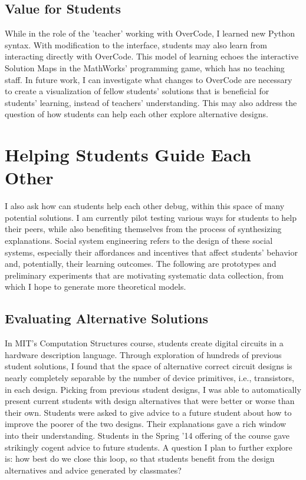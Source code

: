\documentclass{sigchi}
\begin{document}
\subsection{Value for Students}
While in the role of the 'teacher' working with OverCode, I learned new Python syntax. With modification to the interface, students may also learn from interacting directly with OverCode. This model of learning echoes the interactive Solution Maps in the MathWorks' programming game, which has no teaching staff. In future work, I can investigate what changes to OverCode are necessary to create a visualization of fellow students' solutions that is beneficial for students' learning, instead of teachers' understanding. This may also address the question of how students can help each other explore alternative designs.

\section{Helping Students Guide Each Other}
I also ask how can students help each other debug, within this space of many potential solutions. I am currently pilot testing various ways for students to help their peers, while also benefiting themselves from the process of synthesizing explanations. Social system engineering refers to the design of these social systems, especially their affordances and incentives that affect students' behavior and, potentially, their learning outcomes. The following are prototypes and preliminary experiments that are motivating systematic data collection, from which I hope to generate more theoretical models.

\subsection{Evaluating Alternative Solutions} In MIT's Computation Structures course, students create digital circuits in a hardware description language. Through exploration of hundreds of previous student solutions, I found that the space of alternative correct circuit designs is nearly completely separable by the number of device primitives, i.e., transistors, in each design. Picking from previous student designs, I was able to automatically present current students with design alternatives that were better or worse than their own. Students were asked to give advice to a future student about how to improve the poorer of the two designs. Their explanations gave a rich window into their understanding. Students in the Spring '14 offering of the course gave strikingly cogent advice to future students. A question I plan to further explore is: how best do we close this loop, so that students benefit from the design alternatives and advice generated by classmates? 
\end{document}
